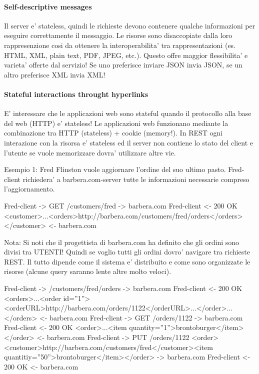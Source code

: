 \paragraph{Self-descriptive messages}
Il server e' stateless, quindi le richieste devono contenere qualche informazioni per eseguire correttamente
il messaggio.
Le risorse sono disaccopiate dalla loro rappresenzione cosi da ottenere la interoperabilita' tra
rappresentazioni (es. HTML, XML, plain text, PDF, JPEG, etc.). Questo offre maggior flessibilita' e varieta'
offerte dal servizio! Se uno preferisce inviare JSON invia JSON, se un altro preferisce XML invia XML!
\paragraph{Stateful interactions throught hyperlinks}
E' interessare che le applicazioni web sono stateful quando il protocollo alla base del web (HTTP) e' stateless!
Le applicazioni web funzionano mediante la combinazione tra HTTP (stateless) + cookie (memory!).
In \gls{REST} ogni interazione con la risorsa e' stateless ed il server non contiene lo stato del client e l'utente
se vuole memorizzare dovra' utilizzare altre vie.

Esempio 1: Fred Flinston vuole aggiornare l'ordine del suo ultimo pasto. Fred-client richiedera' a
barbera.com-server tutte le informazioni necessarie compreso l'aggiornamento.

Fred-client -> GET /customers/fred -> barbera.com
Fred-client <- 200 OK <customer>...<orders>http://barbera.com/customers/fred/orders</orders></customer> <- barbera.com

Nota: Si noti che il progettista di barbera.com ha definito che gli ordini sono divisi tra UTENTI! Quindi se voglio
tutti gli ordini dovro' navigare tra richieste \gls{REST}. Il tutto dipende come il sistema e' distribuito e come sono
organizzate le risorse (alcune query saranno lente altre molto veloci).

Fred-client -> /customers/fred/orders -> barbera.com
Fred-client <- 200 OK <orders>...<order id=''1''><orderURL>http://barbera.com/orders/1122</orderURL>...</order>...</orders> <- barbera.com
Fred-client -> GET /orders/1122 -> barbera.com
Fred-client <- 200 OK <order>...<item quantity=''1''>brontoburger</item></order> <- barbera.com
Fred-client -> PUT /orders/1122 <order><customer>http://barbera.com/customers/fred</customer><item quantitiy=''50''>brontoburger</item></order> -> barbera.com
Fred-client <- 200 OK <- barbera.com

